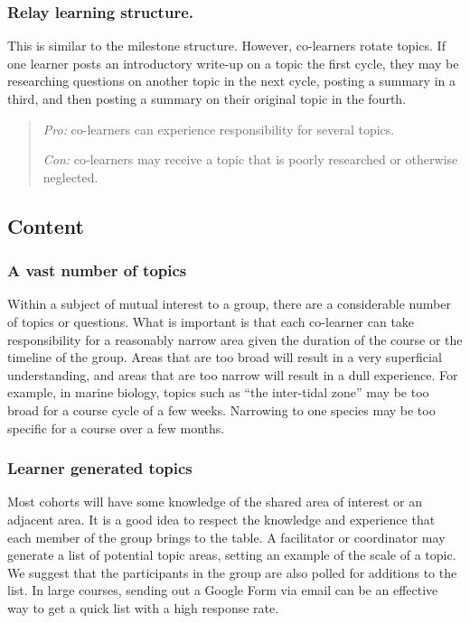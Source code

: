 \subsubsection{Relay learning structure.}

This is similar to the milestone structure. However, co-learners rotate
topics. If one learner posts an introductory write-up on a topic the
first cycle, they may be researching questions on another topic in the
next cycle, posting a summary in a third, and then posting a summary on
their original topic in the fourth.

\begin{quote}
\emph{Pro:} co-learners can experience responsibility for several
topics.

\emph{Con:} co-learners may receive a topic that is poorly researched or
otherwise neglected.
\end{quote}

\subsection{Content}

\subsubsection{A vast number of topics}

Within a subject of mutual interest to a group, there are a considerable
number of topics or questions. What is important is that each co-learner
can take responsibility for a reasonably narrow area given the duration
of the course or the timeline of the group. Areas that are too broad
will result in a very superficial understanding, and areas that are too
narrow will result in a dull experience. For example, in marine biology,
topics such as ``the inter-tidal zone'' may be too broad for a course
cycle of a few weeks. Narrowing to one species may be too specific for a
course over a few months.

\subsubsection{Learner generated topics}

Most cohorts will have some knowledge of the shared area of interest or
an adjacent area. It is a good idea to respect the knowledge and
experience that each member of the group brings to the table. A
facilitator or coordinator may generate a list of potential topic areas,
setting an example of the scale of a topic. We suggest that the
participants in the group are also polled for additions to the list. In
large courses, sending out a Google Form via email can be an effective
way to get a quick list with a high response rate.

